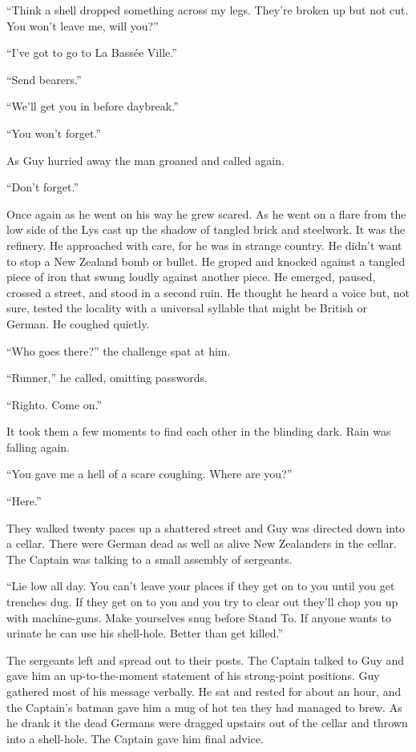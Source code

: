 ``Think a shell dropped something across my legs. They're broken up but not cut. You won't leave me, will you?''

``I've got to go to La Bass\'{e}e Ville.''

``Send bearers.''

``We'll get you in before daybreak.''

``You won't forget.''

As Guy hurried away the man groaned and called again.

``Don't forget.''

Once again as he went on his way he grew scared. As he went on a flare from the low side of the Lys cast up the shadow of tangled brick and steelwork. It was the refinery. He approached with care, for he was in strange country. He didn't want to stop a New Zealand bomb or bullet. He groped and knocked against a tangled piece of iron that swung loudly against another piece. He emerged, paused, crossed a street, and stood in a second ruin. He thought he heard a voice but, not sure, tested the locality with a universal syllable that might be British or German. He coughed quietly.

``Who goes there?'' the challenge spat at him.

``Runner,'' he called, omitting passwords.

``Righto. Come on.''

It took them a few moments to find each other in the blinding dark. Rain was falling again.

``You gave me a hell of a scare coughing. Where are you?''

``Here.''

They walked twenty paces up a shattered street and Guy was directed down into a cellar. There were German dead as well as alive New Zealanders in the cellar. The Captain was talking to a small assembly of sergeants.

``Lie low all day. You can't leave your places if they get on to you until you get trenches dug. If they get on to you and you try to clear out they'll chop you up with machine-guns. Make yourselves snug before Stand To. If anyone wants to urinate he can use his shell-hole. Better than get killed.''

The sergeants left and spread out to their posts. The Captain talked to Guy and gave him an up-to-the-moment statement of his strong-point positions. Guy gathered most of his message verbally. He sat and rested for about an hour, and the Captain's batman gave him a mug of hot tea they had managed to brew. As he drank it the dead Germans were dragged upstairs out of the cellar and thrown into a shell-hole. The Captain gave him final advice.

